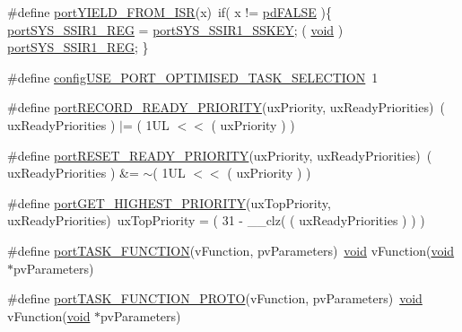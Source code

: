 \begin{DoxyCompactItemize}
\item 
\#define \hyperlink{CCS_2ARM__Cortex-R4_2portmacro_8h_aac6850c66595efdc02a8bbb95fb4648e}{port\-Y\-I\-E\-L\-D\-\_\-\-F\-R\-O\-M\-\_\-\-I\-S\-R}(x)~if( x != \hyperlink{projdefs_8h_aa56260e937e7e203026707e5ba944273}{pd\-F\-A\-L\-S\-E} )\{ \hyperlink{CCS_2ARM__Cortex-R4_2portmacro_8h_a184472c2250fcc96e2e6935ac47301f0}{port\-S\-Y\-S\-\_\-\-S\-S\-I\-R1\-\_\-\-R\-E\-G} = \hyperlink{CCS_2ARM__Cortex-R4_2portmacro_8h_ad501ea9fe336e813daa7a34e43697d2d}{port\-S\-Y\-S\-\_\-\-S\-S\-I\-R1\-\_\-\-S\-S\-K\-E\-Y};  ( \hyperlink{Paradigm_2Tern__EE_2small_2portmacro_8h_a14d32f8130d3c0b212cfc751730b5b49}{void} ) \hyperlink{CCS_2ARM__Cortex-R4_2portmacro_8h_a184472c2250fcc96e2e6935ac47301f0}{port\-S\-Y\-S\-\_\-\-S\-S\-I\-R1\-\_\-\-R\-E\-G}; \}
\item 
\#define \hyperlink{CCS_2ARM__Cortex-R4_2portmacro_8h_aebb8c3a87d591f60f974772be0ee798d}{config\-U\-S\-E\-\_\-\-P\-O\-R\-T\-\_\-\-O\-P\-T\-I\-M\-I\-S\-E\-D\-\_\-\-T\-A\-S\-K\-\_\-\-S\-E\-L\-E\-C\-T\-I\-O\-N}~1
\item 
\#define \hyperlink{CCS_2ARM__Cortex-R4_2portmacro_8h_a113cd9b8401284194da8ddc4569aa484}{port\-R\-E\-C\-O\-R\-D\-\_\-\-R\-E\-A\-D\-Y\-\_\-\-P\-R\-I\-O\-R\-I\-T\-Y}(ux\-Priority, ux\-Ready\-Priorities)~( ux\-Ready\-Priorities ) $\vert$= ( 1\-U\-L $<$$<$ ( ux\-Priority ) )
\item 
\#define \hyperlink{CCS_2ARM__Cortex-R4_2portmacro_8h_aab771d12c0912d93d52a586628fb18a6}{port\-R\-E\-S\-E\-T\-\_\-\-R\-E\-A\-D\-Y\-\_\-\-P\-R\-I\-O\-R\-I\-T\-Y}(ux\-Priority, ux\-Ready\-Priorities)~( ux\-Ready\-Priorities ) \&= $\sim$( 1\-U\-L $<$$<$ ( ux\-Priority ) )
\item 
\#define \hyperlink{CCS_2ARM__Cortex-R4_2portmacro_8h_a5ed536be98084ed8c77c95d79a2688ee}{port\-G\-E\-T\-\_\-\-H\-I\-G\-H\-E\-S\-T\-\_\-\-P\-R\-I\-O\-R\-I\-T\-Y}(ux\-Top\-Priority, ux\-Ready\-Priorities)~ux\-Top\-Priority = ( 31 -\/ \-\_\-\-\_\-clz( ( ux\-Ready\-Priorities ) ) )
\item 
\#define \hyperlink{CCS_2ARM__Cortex-R4_2portmacro_8h_a3a289793652f505c538abea27045ccdf}{port\-T\-A\-S\-K\-\_\-\-F\-U\-N\-C\-T\-I\-O\-N}(v\-Function, pv\-Parameters)~\hyperlink{Paradigm_2Tern__EE_2small_2portmacro_8h_a14d32f8130d3c0b212cfc751730b5b49}{void} v\-Function(\hyperlink{Paradigm_2Tern__EE_2small_2portmacro_8h_a14d32f8130d3c0b212cfc751730b5b49}{void} $\ast$pv\-Parameters)
\item 
\#define \hyperlink{CCS_2ARM__Cortex-R4_2portmacro_8h_a2921e1c5a1f974dfa01ae44d1f665f14}{port\-T\-A\-S\-K\-\_\-\-F\-U\-N\-C\-T\-I\-O\-N\-\_\-\-P\-R\-O\-T\-O}(v\-Function, pv\-Parameters)~\hyperlink{Paradigm_2Tern__EE_2small_2portmacro_8h_a14d32f8130d3c0b212cfc751730b5b49}{void} v\-Function(\hyperlink{Paradigm_2Tern__EE_2small_2portmacro_8h_a14d32f8130d3c0b212cfc751730b5b49}{void} $\ast$pv\-Parameters)
\end{DoxyCompactItemize}
